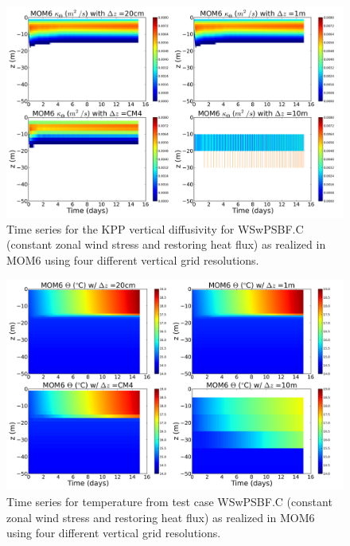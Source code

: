 \begin{figure}[h!t]
\begin{center}
\includegraphics[angle=0,width=14cm]{./figs/MOM6/WSwPSBF_C_MOM6_KPP_diffusivity.png}
\caption[KPP diffusivity from MOM6 for WSwPSBF.C ]{\sf Time series for
  the KPP vertical diffusivity for WSwPSBF.C (constant zonal wind
  stress and restoring heat flux) as realized in MOM6 using four
  different vertical grid resolutions.}
\label{fig:WSwPSBF_C_MOM6_KPP_diffusivity}
\end{center}
\end{figure}


\begin{figure}[h!t]
\begin{center}
\includegraphics[angle=0,width=14cm]{./figs/MOM6/WSwPSBF_C_MOM6_temp.png}
\caption[Temperature from MOM6 for WSwPSBF.C ]{\sf Time series for
  temperature from test case WSwPSBF.C (constant zonal wind stress and
  restoring heat flux) as realized in MOM6 using four different
  vertical grid resolutions.}
\label{fig:WSwPSBF_C_MOM6_temp}
\end{center}
\end{figure}


